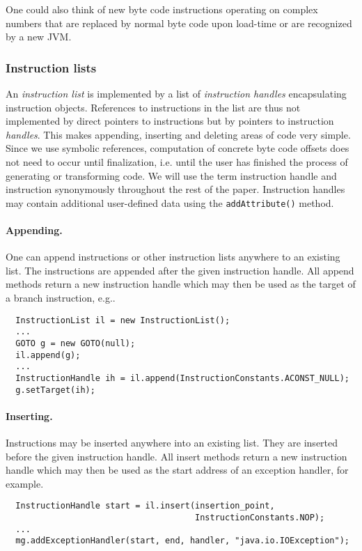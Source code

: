 \documentclass[12pt,twoside]{article}
\begin{document}
One  could also  think  of  new byte  code  instructions operating  on
complex numbers that  are replaced by normal byte  code upon load-time
or are recognized by a new JVM.

\subsubsection{Instruction lists}\label{sec:il}

An \emph{instruction list} is implemented by a list of
\emph{instruction handles} encapsulating instruction objects.
References to instructions in the list are thus not implemented by
direct pointers to instructions but by pointers to instruction
\emph{handles}. This makes appending, inserting and deleting areas of
code very simple. Since we use symbolic references, computation of
concrete byte code offsets does not need to occur until finalization,
i.e.  until the user has finished the process of generating or
transforming code.  We will use the term instruction handle and
instruction synonymously throughout the rest of the paper.
Instruction handles may contain additional user-defined data using the
\texttt{addAttribute()} method.

\paragraph{Appending.}
One can append instructions or  other instruction lists anywhere to an
existing  list.   The  instructions   are  appended  after  the  given
instruction  handle.   All append  methods  return  a new  instruction
handle which may  then be used as the target  of a branch instruction,
e.g..

{\small \begin{verbatim}
  InstructionList il = new InstructionList();
  ...
  GOTO g = new GOTO(null);
  il.append(g);
  ...
  InstructionHandle ih = il.append(InstructionConstants.ACONST_NULL);
  g.setTarget(ih);
\end{verbatim}}

\paragraph{Inserting.}
Instructions may be  inserted anywhere into an existing  list.  They are
inserted  before the  given  instruction handle.   All insert  methods
return a  new instruction handle which  may then be used  as the start
address of an exception handler, for example.

{\small \begin{verbatim}
  InstructionHandle start = il.insert(insertion_point,
                                      InstructionConstants.NOP);
  ...
  mg.addExceptionHandler(start, end, handler, "java.io.IOException");
\end{verbatim}}
\end{document}

